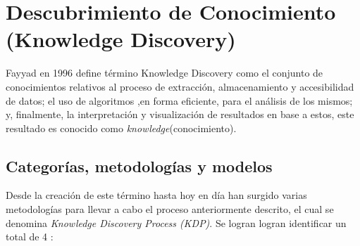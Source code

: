 \section{Descubrimiento de Conocimiento (Knowledge Discovery) \label{sec:knowledge_discovery}}
Fayyad \cite{knowledge_discovery} en 1996 define término Knowledge Discovery como el conjunto de conocimientos relativos al proceso de extracción, almacenamiento y accesibilidad de datos; el uso de algoritmos ,en forma eficiente, para el análisis de los mismos; y, finalmente, la interpretación y visualización de resultados en base a estos, este resultado es conocido como \textit{knowledge}(conocimiento).

\subsection{Categorías, metodologías y modelos \label{sec:problem_categories}}
Desde la creación de este término hasta hoy en día han surgido varias metodologías para llevar a cabo el proceso anteriormente descrito, el cual se denomina \textit{Knowledge Discovery Process (KDP)}. Se logran logran identificar un total de 4 \cite{knowledge_discovery}:

